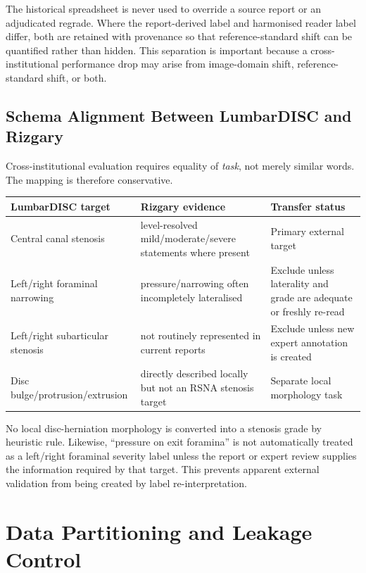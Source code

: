 The historical spreadsheet is never used to override a source report or an
adjudicated regrade. Where the report-derived label and harmonised reader label
differ, both are retained with provenance so that reference-standard shift can
be quantified rather than hidden. This separation is important because a
cross-institutional performance drop may arise from image-domain shift,
reference-standard shift, or both.

\subsection{Schema Alignment Between LumbarDISC and Rizgary}
\label{sec:method-schema-alignment}

Cross-institutional evaluation requires equality of \emph{task}, not merely
similar words. The mapping is therefore conservative.

\begin{center}
\begin{tabular}{p{4.1cm}p{4.0cm}p{5.0cm}}
\toprule
\textbf{LumbarDISC target} & \textbf{Rizgary evidence} & \textbf{Transfer status}\\
\midrule
Central canal stenosis & level-resolved mild/moderate/severe statements where present
& Primary external target\\
Left/right foraminal narrowing & pressure/narrowing often incompletely lateralised
& Exclude unless laterality and grade are adequate or freshly re-read\\
Left/right subarticular stenosis & not routinely represented in current reports
& Exclude unless new expert annotation is created\\
Disc bulge/protrusion/extrusion & directly described locally but not an RSNA stenosis target
& Separate local morphology task\\
\bottomrule
\end{tabular}
\end{center}

No local disc-herniation morphology is converted into a stenosis grade by
heuristic rule. Likewise, ``pressure on exit foramina'' is not automatically
treated as a left/right foraminal severity label unless the report or expert
review supplies the information required by that target. This prevents
apparent external validation from being created by label re-interpretation.

\section{Data Partitioning and Leakage Control}
\label{sec:method-splits}

